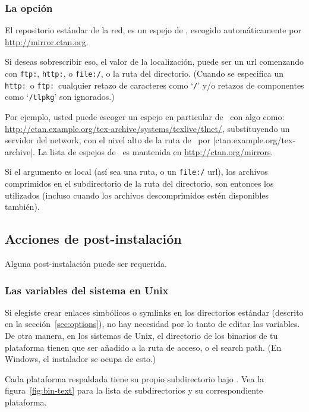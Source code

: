 \documentclass{article}
\begin{document}
\subsubsection{La opción }
\label{sec:location}

El repositorio estándar de la red, es un espejo de \CTAN{}, escogido
automáticamente por \url{http://mirror.ctan.org}.

Si deseas sobrescribir eso, el valor de la localización, puede ser un
url comenzando con \texttt{ftp:}, \texttt{http:}, o \texttt{file:/}, o
la ruta del directorio. (Cuando se especifica un \texttt{http:}\ o
\texttt{ftp:}\ cualquier retazo de caracteres como `\texttt{/}' y/o
retazos de componentes como `\texttt{/tlpkg}' son ignorados.)

Por ejemplo, usted puede escoger un espejo en particular de \CTAN\ con
algo como:
\url{http://ctan.example.org/tex-archive/systems/texlive/tlnet/},
substituyendo un servidor del network, con el nivel alto de la ruta de
\CTAN\ por |ctan.example.org/tex-archive|. La lista de espejos de
\CTAN\ es mantenida en \url{http://ctan.org/mirrors}.

Si el argumento es local (así sea una ruta, o un \texttt{file:/} url),
los archivos comprimidos en el subdirectorio  de la ruta
del directorio, son entonces los utilizados (incluso cuando los archivos
descomprimidos estén disponibles también). 

\subsection{Acciones de post-instalación}
\label{sec:postinstall}

Alguna post-instalación puede ser requerida.

\subsubsection{Las variables del sistema en Unix}
\label{sec:env}

Si elegiste crear enlaces simbólicos o symlinks en los directorios
estándar (descrito en la sección~\ref{sec:options}), no hay necesidad
por lo tanto de editar las variables. De otra manera, en los sistemas
de Unix, el directorio de los binarios de tu plataforma tienen que ser
añadido a la ruta de acceso, o el search path. (En Windows, el
instalador se ocupa de esto.)

Cada plataforma respaldada tiene su propio subdirectorio bajo
. Vea la figura~\ref{fig:bin-text} para la lista
de subdirectorios y su correspondiente plataforma. 
\end{document}
